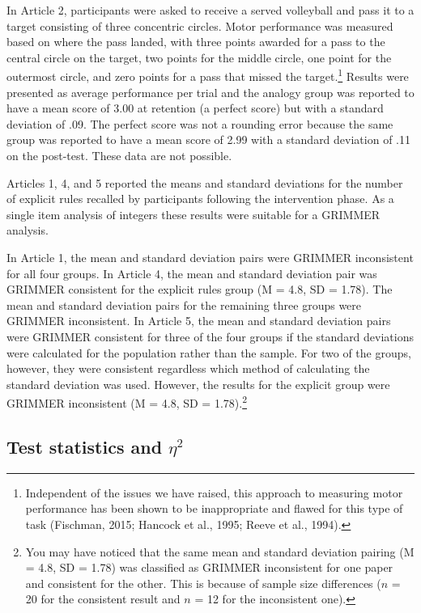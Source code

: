 \documentclass[
  english,
  man,floatsintext]{apa7}
\begin{document}
In Article 2, participants were asked to receive a served volleyball and pass it to a target consisting of three concentric circles. Motor performance was measured based on where the pass landed, with three points awarded for a pass to the central circle on the target, two points for the middle circle, one point for the outermost circle, and zero points for a pass that missed the target.\footnote{Independent of the issues we have raised, this approach to measuring motor performance has been shown to be inappropriate and flawed for this type of task (Fischman, 2015; Hancock et al., 1995; Reeve et al., 1994).} Results were presented as average performance per trial and the analogy group was reported to have a mean score of 3.00 at retention (a perfect score) but with a standard deviation of .09. The perfect score was not a rounding error because the same group was reported to have a mean score of 2.99 with a standard deviation of .11 on the post-test. These data are not possible.

Articles 1, 4, and 5 reported the means and standard deviations for the number of explicit rules recalled by participants following the intervention phase. As a single item analysis of integers these results were suitable for a GRIMMER analysis.

In Article 1, the mean and standard deviation pairs were GRIMMER inconsistent for all four groups. In Article 4, the mean and standard deviation pair was GRIMMER consistent for the explicit rules group (M = 4.8, SD = 1.78). The mean and standard deviation pairs for the remaining three groups were GRIMMER inconsistent. In Article 5, the mean and standard deviation pairs were GRIMMER consistent for three of the four groups if the standard deviations were calculated for the population rather than the sample. For two of the groups, however, they were consistent regardless which method of calculating the standard deviation was used. However, the results for the explicit group were GRIMMER inconsistent (M = 4.8, SD = 1.78).\footnote{You may have noticed that the same mean and standard deviation pairing (M = 4.8, SD = 1.78) was classified as GRIMMER inconsistent for one paper and consistent for the other. This is because of sample size differences (\(n\) = 20 for the consistent result and \(n\) = 12 for the inconsistent one).}

\hypertarget{test-statistics-and-eta2-1}{%
\subsection{\texorpdfstring{Test statistics and \(\eta^{2}\)}{Test statistics and \textbackslash eta\^{}\{2\}}}\label{test-statistics-and-eta2-1}}
\end{document}
